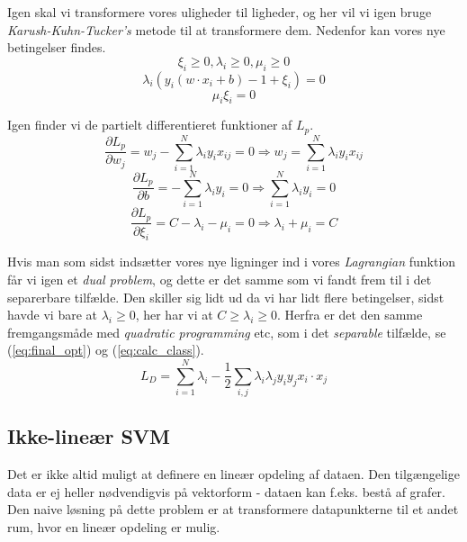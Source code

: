 \documentclass{article}
\begin{document}
Igen skal vi transformere vores uligheder til ligheder, og her vil vi igen bruge \textit{Karush-Kuhn-Tucker's} metode til at transformere dem. Nedenfor kan vores nye betingelser findes.
\begin{equation}
\label{eq:slack_constraint_lambda_i1}
\xi_i \geq 0, \lambda_i \geq 0, \mu_i \geq 0
\end{equation}
\begin{equation}
\label{eq:slack_constraint_lambda_i2}
\lambda_i(y_i(w \cdot x_i + b) - 1 + \xi_i) = 0
\end{equation}
\begin{equation}
\label{eq:slack_constraint_lambda_i3}
\mu_i \xi_i = 0
\end{equation}

Igen finder vi de partielt differentieret funktioner af $L_p$.
\begin{equation}
\label{eq:slack_partial_L_pw}
\frac{\partial L_p}{\partial w_j} = w_j - \sum\limits_{i=1}^N \lambda_i y_i x_{ij} = 0 \Rightarrow w_j = \sum\limits_{i=1}^N \lambda_i y_i x_{ij}
\end{equation}
\begin{equation}
\label{eq:slack_partial_L_pb}
\frac{\partial L_p}{\partial b} = - \sum\limits_{i=1}^N \lambda_i y_i = 0 \Rightarrow \sum\limits_{i=1}^N \lambda_i y_i = 0
\end{equation}
\begin{equation}
\label{eq:slack_partial_L_pxi}
\frac{\partial L_p}{\partial \xi_i} = C - \lambda_i - \mu_i = 0 \Rightarrow \lambda_i + \mu_i = C
\end{equation}

Hvis man som sidst indsætter vores nye ligninger ind i vores \textit{Lagrangian} funktion får vi igen et \textit{dual problem}, og dette er det samme som vi fandt frem til i det separerbare tilfælde. Den skiller sig lidt ud da vi har lidt flere betingelser, sidst havde vi bare at $\lambda_i \geq 0$, her har vi at $C \geq \lambda_i \geq 0$. Herfra er det den samme fremgangsmåde med \textit{quadratic programming} etc, som i det \textit{separable} tilfælde, se (\ref{eq:final_opt}) og (\ref{eq:calc_class}).
\begin{equation}
\label{eq:slack_L_D}
L_D = \sum\limits_{i=1}^N \lambda_i - \frac{1}{2}\sum\limits_{i,j}\lambda_i \lambda_j y_i y_j x_i \cdot x_j
\end{equation}

\subsection{Ikke-lineær SVM}
Det er ikke altid muligt at definere en lineær opdeling af dataen. Den tilgængelige data er ej heller nødvendigvis på vektorform - dataen kan f.eks. bestå af grafer. Den naive løsning på dette problem er at transformere datapunkterne til et andet rum, hvor en lineær opdeling er mulig.
\end{document}
